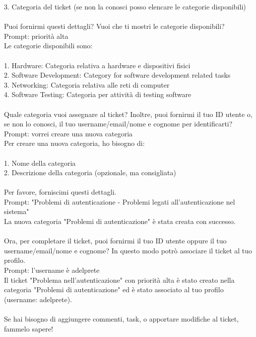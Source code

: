 \begin{windowsconsole}
3. Categoria del ticket (se non la conosci posso elencare le categorie disponibili)\\
\\
Puoi fornirmi questi dettagli? Vuoi che ti mostri le categorie disponibili?\\
Prompt: priorità alta\\
Le categorie disponibili sono:\\
\\
1. Hardware: Categoria relativa a hardware e dispositivi fisici\\
2. Software Development: Category for software development related tasks\\
3. Networking: Categoria relativa alle reti di computer\\
4. Software Testing: Categoria per attività di testing software\\
\\
Quale categoria vuoi assegnare al ticket? Inoltre, puoi fornirmi il tuo ID utente o, se non lo conosci, il tuo username/email/nome e cognome per identificarti?\\
Prompt: vorrei creare una nuova categoria\\
Per creare una nuova categoria, ho bisogno di:\\
\\
1. Nome della categoria\\
2. Descrizione della categoria (opzionale, ma consigliata)\\
\\
Per favore, forniscimi questi dettagli.\\
Prompt: "Problemi di autenticazione - Problemi legati all'autenticazione nel sistema"\\
La nuova categoria "Problemi di autenticazione" è stata creata con successo.\\
\\
Ora, per completare il ticket, puoi fornirmi il tuo ID utente oppure il tuo username/email/nome e cognome? In questo modo potrò associare il ticket al tuo profilo.\\
Prompt: l'username è adelprete\\
Il ticket "Problema nell'autenticazione" con priorità alta è stato creato nella categoria "Problemi di autenticazione" ed è stato associato al tuo profilo (username: adelprete).\\
\\
Se hai bisogno di aggiungere commenti, task, o apportare modifiche al ticket, fammelo sapere!\\
\end{windowsconsole}


